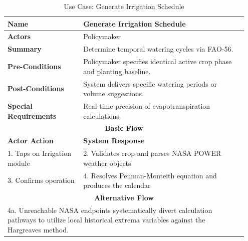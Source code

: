 \begin{table}[htbp]
  \centering
  \caption{Use Case: Generate Irrigation Schedule}
  \label{uc:get_irrigation}
  \begin{tabular}{|p{0.3\linewidth}|p{0.65\linewidth}|}
    \hline
    \textbf{Name} & Generate Irrigation Schedule \\
    \hline
    \textbf{Actors} & Policymaker \\
    \hline
    \textbf{Summary} & Determine temporal watering cycles via FAO-56. \\
    \hline
    \textbf{Pre-Conditions} & Policymaker specifies identical active crop phase and planting baseline. \\
    \hline
    \textbf{Post-Conditions} & System delivers specific watering periods or volume suggestions. \\
    \hline
    \textbf{Special Requirements} & Real-time precision of evapotranspiration calculations. \\
    \hline
    \multicolumn{2}{|c|}{\textbf{Basic Flow}} \\
    \hline
    \textbf{Actor Action} & \textbf{System Response} \\
    \hline
    1. Taps on Irrigation module & 2. Validates crop and parses NASA POWER weather objects \\
    3. Confirms operation & 4. Resolves Penman-Monteith equation and produces the calendar \\
    \hline
    \multicolumn{2}{|c|}{\textbf{Alternative Flow}} \\
    \hline
    \multicolumn{2}{|p{0.95\linewidth}|}{4a. Unreachable NASA endpoints systematically divert calculation pathways to utilize local historical extrema variables against the Hargreaves method.} \\
    \hline
  \end{tabular}
\end{table}

